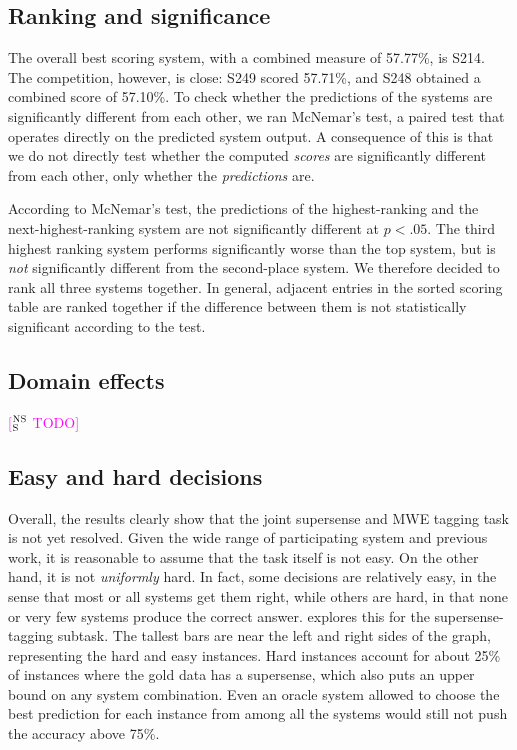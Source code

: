 \documentclass[11pt,letterpaper]{article}
\newcommand{\ensuretext}[1]{#1}
\newcommand{\nssmarker}{\ensuretext{\textcolor{magenta}{\ensuremath{^{\textsc{NS}}_{\textsc{S}}}}}}
\newcommand{\arkcomment}[3]{\ensuretext{\textcolor{#3}{[#1 #2]}}}
\newcommand{\nss}[1]{\arkcomment{\nssmarker}{#1}{magenta}}
\begin{document}
\subsection{Ranking and significance}

The overall best scoring system, with a combined measure of 57.77\%, is S214. 
The competition, however, is close: S249 scored 57.71\%, and S248 obtained a combined score of 57.10\%.  
To check whether the predictions of the systems are significantly different from each other, 
we ran McNemar's test, a paired test that operates directly on the predicted system output. 
A consequence of this is that we do not directly test whether the computed \emph{scores} 
are significantly different from each other, only whether the \emph{predictions} are. 

According to McNemar's test, the predictions of the highest-ranking and the next-highest-ranking system 
are not significantly different at $p < .05$. The third highest ranking system performs significantly worse 
than the top system, but is \emph{not} significantly different from the second-place system. 
We therefore decided to rank all three systems together. 
In general, adjacent entries in the sorted scoring table are ranked together 
if the difference between them is not statistically significant according to the test. 

\subsection{Domain effects}

\nss{TODO}

\subsection{Easy and hard decisions}

Overall, the results clearly show that the joint supersense and MWE tagging task is not yet resolved. 
Given the wide range of participating system and previous work, it is reasonable to assume that 
the task itself is not easy. On the other hand, it is not \emph{uniformly} hard. 
In fact, some decisions are relatively easy, in the sense that most or all systems get them right, 
while others are hard, in that none or very few systems produce the correct answer. 
 explores this for the supersense-tagging subtask. 
The tallest bars are near the left and right sides of the graph, representing the hard and easy instances. 
Hard instances account for about 25\% of instances where the gold data has a supersense, 
which also puts an upper bound on any system combination. 
Even an oracle system allowed to choose the best prediction for each instance 
from among all the systems would still not push the accuracy above 75\%.
\end{document}
